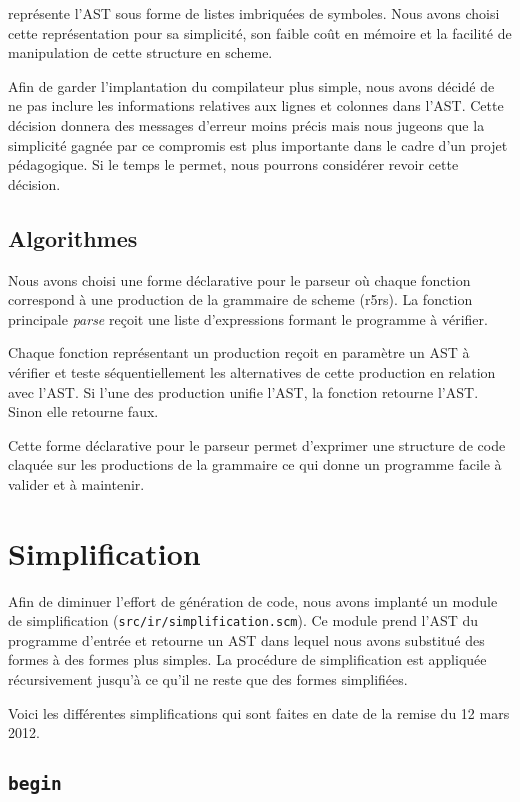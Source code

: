 \documentclass[11pt]{report}
\begin{document}
\sins{} représente l'AST sous forme de listes imbriquées de symboles. Nous
avons choisi cette représentation pour sa simplicité, son faible coût en
mémoire et la facilité de manipulation de cette structure en scheme.

Afin de garder l'implantation du compilateur plus simple, nous avons décidé de
ne pas inclure les informations relatives aux lignes et colonnes dans
l'AST. Cette décision donnera des messages d'erreur moins précis mais nous
jugeons que la simplicité gagnée par ce compromis est plus importante dans le
cadre d'un projet pédagogique. Si le temps le permet, nous pourrons considérer
revoir cette décision.

\subsection{Algorithmes}

Nous avons choisi une forme déclarative pour le parseur où chaque fonction
correspond à une production de la grammaire de scheme (r5rs). La fonction
principale \emph{parse} reçoit une liste d'expressions formant le programme à
vérifier.

Chaque fonction représentant un production reçoit en paramètre un AST à
vérifier et teste séquentiellement les alternatives de cette production en
relation avec l'AST. Si l'une des production unifie l'AST, la fonction retourne
l'AST. Sinon elle retourne faux. 

Cette forme déclarative pour le parseur permet d'exprimer une structure de
code claquée sur les productions de la grammaire ce qui donne un programme
facile à valider et à maintenir.


\section{Simplification}

Afin de diminuer l'effort de génération de code, nous avons implanté
un module de simplification ({\tt src/ir/simplification.scm}). Ce
module prend l'AST du programme d'entrée et retourne un AST dans
lequel nous avons substitué des formes à des formes plus simples. La
procédure de simplification est appliquée récursivement jusqu'à ce
qu'il ne reste que des formes simplifiées.

Voici les différentes simplifications qui sont faites en date de la
remise du 12 mars 2012.

\subsection{\tt begin}
\end{document}
